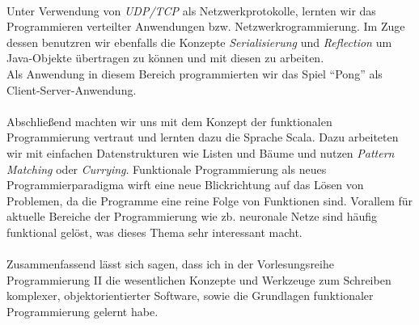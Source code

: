 \documentclass[10pt, a4paper]{article}
\begin{document}
\paragraph*{}
Unter Verwendung von \textit{UDP/TCP} als Netzwerkprotokolle, lernten wir das Programmieren verteilter Anwendungen bzw. Netzwerkrogrammierung. Im Zuge dessen benutzren wir ebenfalls die Konzepte \textit{Serialisierung} und \textit{Reflection} um Java-Objekte übertragen zu können und mit diesen zu arbeiten.\\
Als Anwendung in diesem Bereich programmierten wir das Spiel \enquote{Pong} als Client-Server-Anwendung.\par

\paragraph*{}
Abschließend machten wir uns mit dem Konzept der funktionalen Programmierung vertraut und lernten dazu die Sprache Scala. Dazu arbeiteten wir mit einfachen Datenstrukturen wie Listen und Bäume und nutzen \textit{Pattern Matching} oder \textit{Currying}. Funktionale Programmierung als neues Programmierparadigma wirft eine neue Blickrichtung auf das Lösen von Problemen, da die Programme eine reine Folge von Funktionen sind. Vorallem für aktuelle Bereiche der Programmierung wie zb. neuronale Netze sind häufig funktional gelöst, was dieses Thema sehr interessant macht.\par

\paragraph*{}
Zusammenfassend lässt sich sagen, dass ich in der Vorlesungsreihe Programmierung II die wesentlichen Konzepte und Werkzeuge zum Schreiben komplexer, objektorientierter Software, sowie die Grundlagen funktionaler Programmierung gelernt habe.
\end{document}
